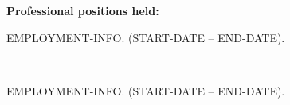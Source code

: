 \begin{titlepage}
\begin{flushleft}
\begin{singlespace}
  \end{singlespace} 
  \vspace{8pt}
	{\bf Professional positions held:}\\
	\begin{singlespace}
	{\hspace{0.4in}}\parbox[t]{5.5in}{EMPLOYMENT-INFO. (START-DATE -- END-DATE).}\\
	{\vspace{5pt}}
	{\hspace{0.4in}}\parbox[t]{5.5in}{EMPLOYMENT-INFO. (START-DATE -- END-DATE).}\\
	\end{singlespace}
\end{flushleft}
       
\end{titlepage}
\par\vfil


